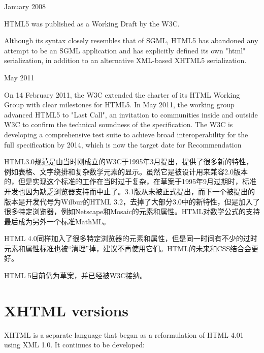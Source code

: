 \begin{compactitem}
\item January 2008

HTML5 was published as a Working Draft by the W3C.

Although its syntax closely resembles that of SGML, HTML5 has abandoned any attempt to be an SGML application and has explicitly defined its own "html" serialization, in addition to an alternative XML-based XHTML5 serialization.

\item May 2011

On 14 February 2011, the W3C extended the charter of its HTML Working Group with clear milestones for HTML5. In May 2011, the working group advanced HTML5 to "Last Call", an invitation to communities inside and outside W3C to confirm the technical soundness of the specification. The W3C is developing a comprehensive test suite to achieve broad interoperability for the full specification by 2014, which is now the target date for Recommendation


\end{compactitem}

HTML3.0规范是由当时刚成立的W3C于1995年3月提出，提供了很多新的特性，例如表格、文字绕排和复杂数学元素的显示。虽然它是被设计用来兼容2.0版本的，但是实现这个标准的工作在当时过于复杂，在草案于1995年9月过期时，标准开发也因为缺乏浏览器支持而中止了。3.1版从未被正式提出，而下一个被提出的版本是开发代号为Wilbur的HTML 3.2，去掉了大部分3.0中的新特性，但是加入了很多特定浏览器，例如Netscape和Mosaic的元素和属性。HTML对数学公式的支持最后成为另外一个标准MathML。

HTML 4.0同样加入了很多特定浏览器的元素和属性，但是同一时间有不少的过时元素和属性标准也被“清理”掉，建议不再使用它们。HTML的未来和CSS结合会更好。

HTML 5目前仍为草案，并已经被W3C接纳。


\section{XHTML versions}

XHTML is a separate language that began as a reformulation of HTML 4.01 using XML 1.0. It continues to be developed:

